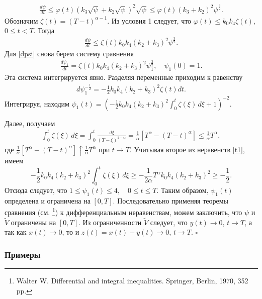 \documentclass[../main.tex]{subfiles}
\begin{document}
\begin{gather*}
        \frac{d\psi}{dt} \leqslant \varphi (t) \left(k_3 \sqrt{\psi} + k_2\sqrt{\psi}\right)^2 \sqrt{\psi} \leqslant \varphi(t) (k_3 + k_2)^2 \psi^\frac{3}{2}.
\end{gather*}
Обозначим $  \zeta (t) = {(T - t)^{\alpha-1}}$.
 Из условия 1 следует, что  $\varphi(t) \leqslant k_0k_4\zeta (t)$, $0 \leqslant t<T$. Тогда 
\begin{gather}\label{dpsi}
        \frac{d\psi}{dt} \leqslant  \zeta(t) k_0k_4(k_2 + k_3)^2 \psi^\frac{3}{2}.
\end{gather}
Для \eqref{dpsi} снова берем систему сравнения 
\begin{gather*}
		\frac{d\psi_1}{dt} = \zeta (t) k_0k_4 (k_2 + k_3)^2 \psi_1^\frac{3}{2}, \quad \psi_1(0)=1.
\end{gather*}
Эта система интегрируется явно.
Разделяя переменные приходим к равенству
\begin{gather*}
		d\psi_1^{- \frac{1}{2}} = - \frac{1}{2} k_0 k_4 (k_2 + k_3)^2 \zeta (t) dt.
\end{gather*}
Интегрируя, находим $\psi_1(t) =  \left(-\frac{1}{2} k_0 k_4 (k_2 + k_3)^2 \displaystyle{\int^t_{0}} \zeta (\xi) \, d\xi +1\right)^{-2}. $


Далее, получаем \begin{gather*}
		\int^t_{0} \zeta (\xi) \, d\xi = \int^t_{0} \frac{d\xi}{(T - \xi)^{1-\alpha}} = \frac{1}{\alpha} \left[ T ^\alpha -  (T - t)^\alpha \right] \leqslant \frac{1}{\alpha} T ^\alpha, 
\end{gather*}
где $\frac{1}{\alpha} \left[T ^\alpha -  (T - t)^\alpha \right]  \uparrow  \frac{1}{\alpha} T ^\alpha$ при $ t\rightarrow T $. Учитывая второе из неравенств \eqref{t1}, имеем
$$-\frac{1}{2} k_0 k_4 (k_2 + k_3)^2 \int^t_{0} \zeta (\xi) \, d\xi \geqslant -\frac{1}{2\alpha} T ^\alpha  k_0 k_4 (k_2 + k_3)^2 \geqslant -\frac{1}{2}. $$
Отсюда следует, что 
$ 1 \leqslant \psi_1(t) \leqslant 4, \quad 0 \leqslant t \leqslant T$.
Таким образом, $\psi_1 (t)$ определена и ограничена на $[0, T]$. Последовательно применяя теоремы сравнения (см.  \footnote{Walter W. Differential and integral inequalities. Springer, Berlin, 1970, 352 pp.}) к дифференциальным неравенствам,  можем заключить, что  $\psi$ и $\widetilde{V}$ ограничены на $[0, T]$. Из ограниченности $\widetilde{V}$ следует, что $y(t) \rightarrow 0$, $t \rightarrow T$, а так как $x(t) \rightarrow 0$, то и $z(t) = x(t) + y(t) \rightarrow 0$, $t \rightarrow T$.
\hfill $\square$
\subsubsection{Примеры}
\end{document}
